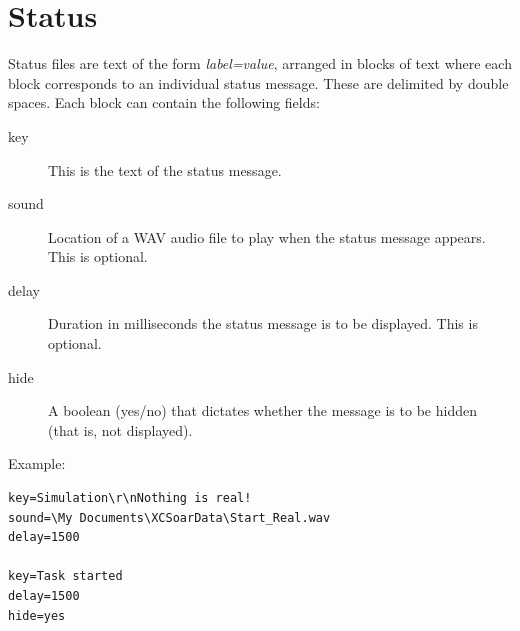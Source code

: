 \section{Status}\label{sec:status-file}

Status files are text of the form {\em label=value}, arranged in
blocks of text where each block corresponds to an individual status
message.  These are delimited by double spaces.  Each block can
contain the following fields:
\begin{description}
\item[key]  This is the text of the status message.
\item[sound] Location of a WAV audio file to play when the status
  message appears.  This is optional.
\item[delay] Duration in milliseconds the status message is
  to be displayed.  This is optional.
\item[hide] A boolean (yes/no) that dictates whether the message
 is to be hidden (that is, not displayed). 
\end{description} 

Example:
\begin{verbatim}
key=Simulation\r\nNothing is real!
sound=\My Documents\XCSoarData\Start_Real.wav
delay=1500

key=Task started
delay=1500
hide=yes
\end{verbatim}
